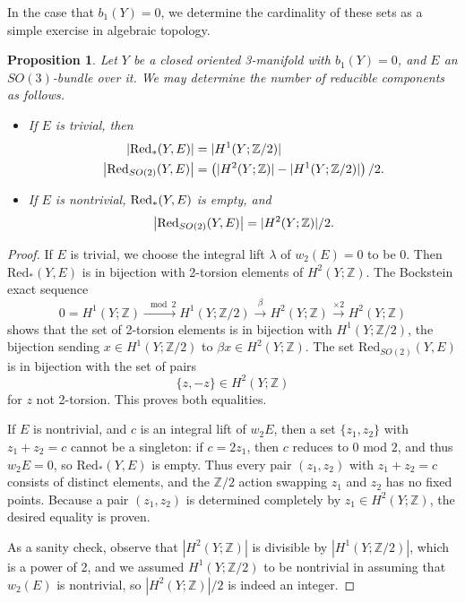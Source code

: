 \documentclass{memo-l}
\newtheorem{proposition}[theorem]{Proposition}
\theoremstyle{definition}
\theoremstyle{remark}
\numberwithin{section}{chapter}
\numberwithin{equation}{chapter}
\begin{document}
In the case that $b_1(Y) = 0$, we determine the cardinality of these sets as a simple exercise in algebraic topology.

\begin{proposition}\label{red-enumerate}Let $Y$ be a closed oriented 3-manifold with $b_1(Y) = 0$, and $E$ an $SO(3)$-bundle over it. We may determine the number of reducible components as follows.\begin{itemize}

\item If $E$ is trivial, then \begin{align*}|\textup{Red}_*(Y,E)| &= |H^1(Y;\mathbb Z/2)| \\ \big|\textup{Red}_{SO(2)}(Y,E)\big| &= \left(|H^2(Y;\mathbb Z)| - |H^1(Y;\mathbb Z/2)|\right)/2.\end{align*}

\item If $E$ is nontrivial, $\textup{Red}_*(Y,E)$ is empty, and $$\big|\textup{Red}_{SO(2)}(Y,E)\big| = |H^2(Y;\mathbb Z)|/2.$$
\end{itemize}\end{proposition}

\begin{proof}If $E$ is trivial, we choose the integral lift $\lambda$ of $w_2(E) = 0$ to be $0$. Then $\text{Red}_*(Y,E)$ is in bijection with 2-torsion elements of $H^2(Y;\mathbb Z)$. The Bockstein exact sequence $$0 = H^1(Y;\mathbb Z) \xrightarrow{\mod 2} H^1(Y;\mathbb Z/2) \xrightarrow{\beta} H^2(Y;\mathbb Z) \xrightarrow{\times 2} H^2(Y;\mathbb Z)$$ shows that the set of 2-torsion elements is in bijection with $H^1(Y;\mathbb Z/2)$, the bijection sending $x \in H^1(Y;\mathbb Z/2)$ to $\beta x \in H^2(Y;\mathbb Z)$. The set $\text{Red}_{SO(2)}(Y,E)$ is in bijection with the set of pairs $$\{z, -z\} \in H^2(Y;\mathbb Z)$$ for $z$ not 2-torsion. This proves both equalities.

If $E$ is nontrivial, and $c$ is an integral lift of $w_2 E$, then a set $\{z_1, z_2\}$ with $z_1 + z_2 = c$ cannot be a singleton: if $c = 2z_1$, then $c$ reduces to $0$ mod $2$, and thus $w_2 E = 0$, so $\text{Red}_*(Y,E)$ is empty. Thus every pair $(z_1, z_2)$ with $z_1 + z_2 = c$ consists of distinct elements, and the $\mathbb Z/2$ action swapping $z_1$ and $z_2$ has no fixed points. Because a pair $(z_1, z_2)$ is determined completely by $z_1 \in H^2(Y;\mathbb Z)$, the desired equality is proven.

As a sanity check, observe that $|H^2(Y;\mathbb Z)|$ is divisible by $|H^1(Y;\mathbb Z/2)|$, which is a power of 2, and we assumed $H^1(Y;\mathbb Z/2)$ to be nontrivial in assuming that $w_2(E)$ is nontrivial, so $|H^2(Y;\mathbb Z)|/2$ is indeed an integer.
\end{proof}
\end{document}

